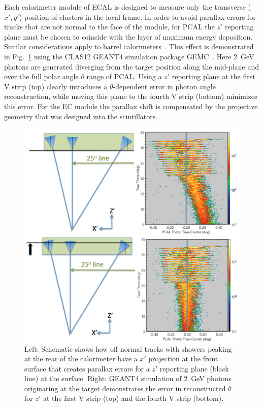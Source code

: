 Each calorimeter module of ECAL is designed to measure only the transverse ($x',y'$) position of clusters in the local frame.  In order to avoid parallax errors for tracks that are not normal to the face of the module, for PCAL the $z'$ reporting plane must be chosen to coincide with the layer of maximum energy deposition.  Similar considerations apply to barrel calorimeters~\cite{nima2018}. This effect is demonstrated in Fig.~\ref{fig:S6_1} using the CLAS12 GEANT4 simulation package GEMC~\cite{nim:sim}.  Here 2~GeV photons are generated diverging from the target position along the mid-plane and over the full polar
angle $\theta$ range of PCAL. Using a $z'$ reporting plane at the first V strip (top) clearly introduces a
$\theta$-dependent error in photon angle reconstruction, while moving this plane to the fourth V strip (bottom)
minimizes this error. For the EC module the parallax shift is compensated by the projective geometry that was
designed into the scintillators.    

\begin{figure}[hbt]
\centering
\includegraphics[width=0.95\columnwidth,keepaspectratio]{img/S6_1.png}
\caption{Left: Schematic shows how off-normal tracks with showers peaking at the rear of the calorimeter have
  a $x'$ projection at the front surface that creates parallax errors for a $z'$ reporting plane (black line) at the surface.
  Right: GEANT4 simulation of 2~GeV photons originating at the target demonstrates the error in reconstructed
  $\theta$ for $z'$ at the first V strip (top) and the fourth V strip (bottom).}
\label{fig:S6_1}
\end{figure}


